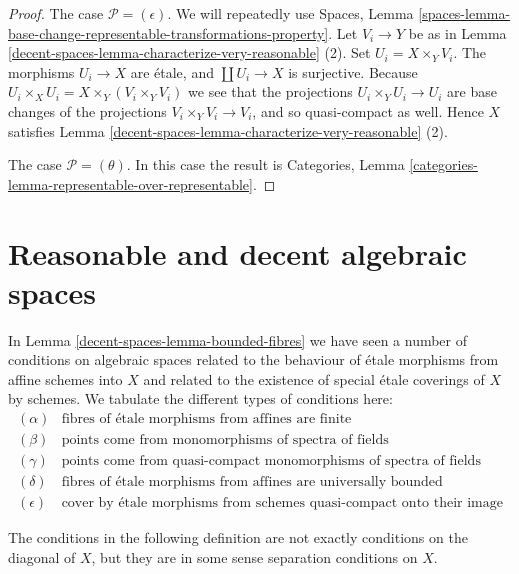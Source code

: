\begin{proof}
\medskip\noindent
The case $\mathcal{P} = (\epsilon)$. We will repeatedly use
Spaces, Lemma
\ref{spaces-lemma-base-change-representable-transformations-property}.
Let $V_i \to Y$ be as in
Lemma \ref{decent-spaces-lemma-characterize-very-reasonable} (2).
Set $U_i = X \times_Y V_i$. The morphisms $U_i \to X$ are \'etale,
and $\coprod U_i \to X$ is surjective. Because
$U_i \times_X U_i = X \times_Y (V_i \times_Y V_i)$ we see
that the projections $U_i \times_Y U_i \to U_i$ are
base changes of the projections $V_i \times_Y V_i \to V_i$, and so
quasi-compact as well. Hence $X$ satisfies
Lemma \ref{decent-spaces-lemma-characterize-very-reasonable} (2).

\medskip\noindent
The case $\mathcal{P} = (\theta)$. In this case the result is
Categories, Lemma \ref{categories-lemma-representable-over-representable}.
\end{proof}

\section{Reasonable and decent algebraic spaces}
\label{decent-spaces-section-reasonable-decent}
In
Lemma \ref{decent-spaces-lemma-bounded-fibres}
we have seen a number of conditions on algebraic spaces related to
the behaviour of \'etale morphisms from affine schemes into $X$
and related to the existence of special \'etale coverings of $X$ by
schemes. We tabulate the different types of conditions here:
$$
\boxed{
\begin{matrix}
(\alpha) & \text{fibres of \'etale morphisms from affines are finite} \\
(\beta) & \text{points come from monomorphisms of spectra of fields} \\
(\gamma) & \text{points come from quasi-compact monomorphisms of
spectra of fields} \\
(\delta) & \text{fibres of \'etale morphisms from affines are universally
bounded} \\
(\epsilon) & \text{cover by \'etale morphisms from schemes quasi-compact
onto their image}
\end{matrix}
}
$$

\medskip\noindent
The conditions in the following definition
are not exactly conditions on the diagonal of $X$, but they are in some
sense separation conditions on $X$.

